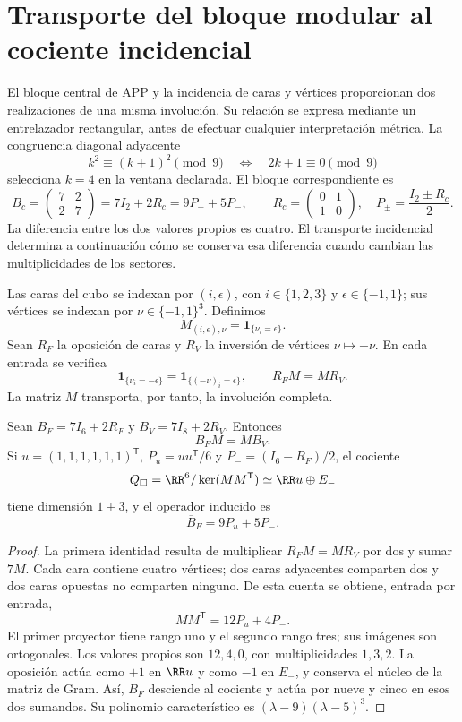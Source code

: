 \section{Transporte del bloque modular al cociente incidencial}
\label{sec:incidence-transport-new}
El bloque central de APP y la incidencia de caras y vértices proporcionan
dos realizaciones de una misma involución. Su relación se expresa mediante
un entrelazador rectangular, antes de efectuar cualquier interpretación
métrica. La congruencia diagonal adyacente
\[
 k^2\equiv(k+1)^2\pmod9
 \quad\Longleftrightarrow\quad 2k+1\equiv0\pmod9
\]
selecciona \(k=4\) en la ventana declarada. El bloque correspondiente es
\[
 B_c=\begin{pmatrix}7&2\\2&7\end{pmatrix}
 =7I_2+2R_c=9P_++5P_-,\qquad
 R_c=\begin{pmatrix}0&1\\1&0\end{pmatrix},\quad
 P_\pm=\frac{I_2\pm R_c}{2}.
\]
La diferencia entre los dos valores propios es cuatro. El transporte
incidencial determina a continuación cómo se conserva esa diferencia
cuando cambian las multiplicidades de los sectores.

Las caras del cubo se indexan por \((i,\epsilon)\), con
\(i\in\{1,2,3\}\) y \(\epsilon\in\{-1,1\}\); sus vértices se
indexan por \(\nu\in\{-1,1\}^3\). Definimos
\[
 M_{(i,\epsilon),\nu}=\mathbf1_{\{\nu_i=\epsilon\}}.
\]
Sean \(R_F\) la oposición de caras y \(R_V\) la inversión de vértices
\(\nu\mapsto-\nu\). En cada entrada se verifica
\[
 \mathbf1_{\{\nu_i=-\epsilon\}}
 =\mathbf1_{\{(-\nu)_i=\epsilon\}},\qquad R_FM=MR_V.
\]
La matriz \(M\) transporta, por tanto, la involución completa.

\begin{theorem}
Sean \(B_F=7I_6+2R_F\) y \(B_V=7I_8+2R_V\). Entonces
\[
 B_FM=MB_V.
\]
Si \(u=(1,1,1,1,1,1)^{\mathsf T}\),
\(P_u=uu^{\mathsf T}/6\) y \(P_-=(I_6-R_F)/2\), el cociente
\[
 Q_\square=\RR^6/\ker(MM^{\mathsf T})
 \simeq\RR u\oplus E_-
\]
tiene dimensión \(1+3\), y el operador inducido es
\[
 \overline B_F=9P_u+5P_-.
\]
\end{theorem}
\begin{proof}
La primera identidad resulta de multiplicar \(R_FM=MR_V\) por dos
y sumar \(7M\). Cada cara contiene cuatro vértices; dos caras adyacentes
comparten dos y dos caras opuestas no comparten ninguno. De esta cuenta se
obtiene, entrada por entrada,
\[
 MM^{\mathsf T}=12P_u+4P_-.
\]
El primer proyector tiene rango uno y el segundo rango tres; sus imágenes
son ortogonales. Los valores propios son \(12,4,0\), con multiplicidades
\(1,3,2\). La oposición actúa como \(+1\) en \(\RR u\) y como
\(-1\) en \(E_-\), y conserva el núcleo de la matriz de Gram. Así,
\(B_F\) desciende al cociente y actúa por nueve y cinco en esos dos
sumandos. Su polinomio característico es
\((\lambda-9)(\lambda-5)^3\).
\end{proof}

